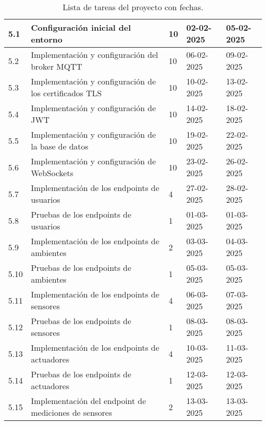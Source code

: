 \begin{table}[ht]
\begin{tabularx}{\linewidth}{|p{1cm}|p{10cm}|p{1cm}|p{1.8cm}|p{1.8cm}|}
		5.1  & Configuración inicial del entorno                                                                        & 10    & 02-02-2025 & 05-02-2025 \\ \hline
		5.2  & Implementación y configuración del broker MQTT                                                           & 10    & 06-02-2025 & 09-02-2025 \\ \hline
		5.3  & Implementación y configuración de los certificados TLS                                                   & 10    & 10-02-2025 & 13-02-2025 \\ \hline
		5.4  & Implementación y configuración de JWT                                                                    & 10    & 14-02-2025 & 18-02-2025 \\ \hline
		5.5  & Implementación y configuración de la base de datos                                                       & 10    & 19-02-2025 & 22-02-2025 \\ \hline
		5.6  & Implementación y configuración de WebSockets                                                             & 10    & 23-02-2025 & 26-02-2025 \\ \hline
		5.7  & Implementación de los endpoints de usuarios                                                              & 4     & 27-02-2025 & 28-02-2025 \\ \hline
		5.8  & Pruebas de los endpoints de usuarios                                                                     & 1     & 01-03-2025 & 01-03-2025 \\ \hline
		5.9  & Implementación de los endpoints de ambientes                                                             & 2     & 03-03-2025 & 04-03-2025 \\ \hline
		5.10 & Pruebas de los endpoints de ambientes                                                                    & 1     & 05-03-2025 & 05-03-2025 \\ \hline
		5.11 & Implementación de los endpoints de sensores                                                              & 4     & 06-03-2025 & 07-03-2025 \\ \hline
		5.12 & Pruebas de los endpoints de sensores                                                                     & 1     & 08-03-2025 & 08-03-2025 \\ \hline
		5.13 & Implementación de los endpoints de actuadores                                                            & 4     & 10-03-2025 & 11-03-2025 \\ \hline
		5.14 & Pruebas de los endpoints de actuadores                                                                   & 1     & 12-03-2025 & 12-03-2025 \\ \hline
		5.15 & Implementación del endpoint de mediciones de sensores                                                    & 2     & 13-03-2025 & 13-03-2025 \\ \hline
	\end{tabularx}
	\caption{Lista de tareas del proyecto con fechas.}
	\label{tab:tabGantt}
\end{table}

